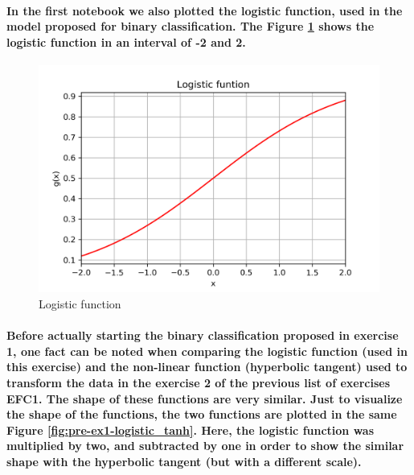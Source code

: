 \documentclass[a4paper]{article}    %
\begin{document}
\paragraph{In the first notebook we also plotted the logistic function, used in the model proposed for binary classification. The Figure \ref{fig:pre-ex1-logistic} shows the logistic function in an interval of -2 and 2.}

\begin{figure}[H]
    \centering
    \includegraphics[width=12cm]{logistic_function}
    \caption{Logistic function}
    \label{fig:pre-ex1-logistic}
\end{figure}

\paragraph{Before actually starting the binary classification proposed in exercise 1, one fact can be noted when comparing the logistic function (used in this exercise) and the non-linear function (hyperbolic tangent) used to transform the data in the exercise 2 of the previous list of exercises EFC1. The shape of these functions are very similar. Just to visualize the shape of the functions, the two functions are plotted in the same Figure \ref{fig:pre-ex1-logistic_tanh}. Here, the logistic function was multiplied by two, and subtracted by one in order to show the similar shape with the hyperbolic tangent (but with a different scale).}
\end{document}
